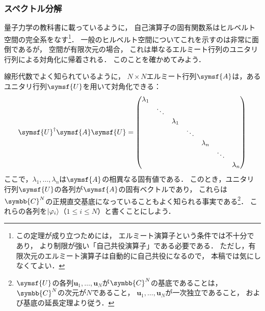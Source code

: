 \documentclass[
]{sotsu}
\begin{document}
\subsubsection{スペクトル分解}
\label{sec:spectrum-decomposition}

量子力学の教科書に載っているように，
自己演算子の固有関数系はヒルベルト空間の完全系をなす\footnote{
    この定理が成り立つためには，
    エルミート演算子という条件では不十分であり，
    より制限が強い「自己共役演算子」である必要である．
    ただし，有限次元のエルミート演算子は自動的に自己共役になるので，
    本稿では気にしなくてよい．
}．
一般のヒルベルト空間についてこれを示すのは非常に面倒であるが，
空間が有限次元の場合，
これは単なるエルミート行列のユニタリ行列による対角化に帰着される．
このことを確かめてみよう．

線形代数でよく知られているように，
$N \times N$エルミート行列$\symsf{A}$は，あるユニタリ行列$\symsf{U}$を用いて対角化できる：
\begin{equation}
    \label{eq:diagonalize-of-Hermitian}
    \adjoint{\symsf{U}} \symsf{A} \symsf{U}
        = 
        \begin{pmatrix}
            \lambda_1  \\
            & \ddots  \\
            & & \lambda_1  \\
            & & & \ddots  \\
            & & & & \lambda_n  \\
            & & & & & \ddots  \\
            & & & & & & \lambda_n
        \end{pmatrix}
\end{equation}
ここで，$\lambda_1, \dots, \lambda_n$は$\symsf{A}$の相異なる固有値である．
このとき，ユニタリ行列$\symsf{U}$の各列が$\symsf{A}$の固有ベクトルであり，
これらは$\symbb{C}^N$の正規直交基底になっていることもよく知られる事実である\footnote{
    $\symsf{U}$の各列$\symbf{u}_1, \dots, \symbf{u}_N$が$\symbb{C}^N$の基底であることは，
    $\symbb{C}^N$の次元が$N$であること，
    $\symbf{u}_1, \dots, \symbf{u}_N$が一次独立であること，
    および基底の延長定理より従う．
}．
これらの各列を$\ket{\varphi_i}$（$1 \leq i \leq N$）と書くことにしよう．
\end{document}
